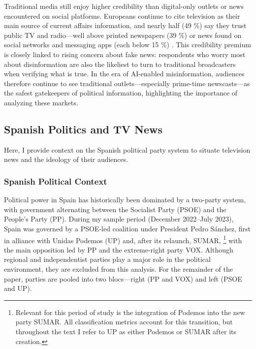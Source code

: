 \documentclass[12pt]{article}
\begin{document}
	
	

	
	
Traditional media still enjoy higher credibility than digital-only outlets or news encountered on social platforms. Europeans continue to cite television as their main source of current affairs information, and nearly half (49 \%) say they trust public TV and radio—well above printed newspapers (39 \%) or news found on social networks and messaging apps (each below 15 \%) \citep{eurobarometer2022}. This credibility premium is closely linked to rising concern about fake news: respondents who worry most about disinformation are also the likeliest to turn to traditional broadcasters when verifying what is true. In the era of AI-enabled misinformation, audiences therefore continue to see traditional outlets—especially prime-time newscasts—as the safest gatekeepers of political information, highlighting the importance of analyzing these markets. 
	
	
	
	
	
	
	\subsection{Spanish Politics and TV News}
	
	
	
Here, I provide context on the Spanish political party system to situate television news and the ideology of their audiences.

	
	
	
	\subsubsection*{Spanish Political Context}
	

	

	
	
	Political power in Spain has historically been dominated by a two-party system, with government alternating between the Socialist Party (PSOE) and the People’s Party (PP). During my sample period (December 2022–July 2023), Spain was governed by a PSOE-led coalition under President Pedro Sánchez, first in alliance with Unidas Podemos (UP) and, after its relaunch, SUMAR, \footnote{Relevant for this period of study is the integration of Podemos into the new party SUMAR. All classification metrics account for this transition, but throughout the text I refer to UP as either Podemos or SUMAR after its creation.} with the main opposition led by PP and the extreme-right party VOX. Although regional and independentist parties play a major role in the political environment, they are excluded from this analysis. For the remainder of the paper, parties are pooled into two blocs—right (PP and VOX) and left (PSOE and UP).
	
\end{document}
